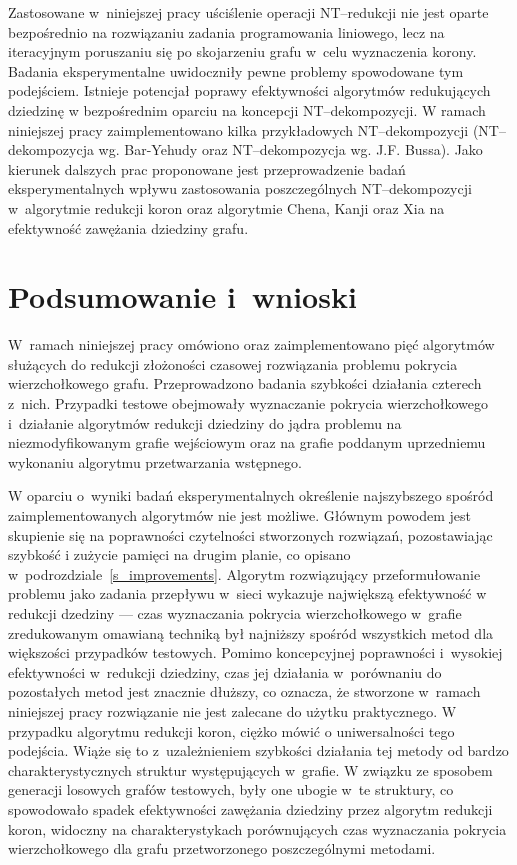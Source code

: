   Zastosowane w~niniejszej pracy uściślenie operacji NT--redukcji nie jest oparte bezpośrednio na rozwiązaniu zadania programowania liniowego, lecz na iteracyjnym poruszaniu się po skojarzeniu grafu w~celu wyznaczenia korony.
  Badania eksperymentalne uwidoczniły pewne problemy spowodowane tym podejściem.
  Istnieje potencjał poprawy efektywności algorytmów redukujących dziedzinę w bezpośrednim oparciu na koncepcji NT--dekompozycji.
  W ramach niniejszej pracy zaimplementowano kilka przykładowych NT--dekompozycji (NT--dekompozycja wg. Bar-Yehudy oraz NT--dekompozycja wg. J.F. Bussa).
  Jako kierunek dalszych prac proponowane jest przeprowadzenie badań eksperymentalnych wpływu zastosowania poszczególnych NT--dekompozycji w~algorytmie redukcji koron oraz algorytmie Chena, Kanji oraz Xia na efektywność zawężania dziedziny grafu.

\section*{Podsumowanie i~wnioski}
\addtocounter{section}{1}
  W~ramach niniejszej pracy omówiono oraz zaimplementowano pięć algorytmów służących do redukcji złożoności czasowej rozwiązania problemu pokrycia wierzchołkowego grafu. Przeprowadzono badania szybkości działania czterech z~nich.
  Przypadki testowe obejmowały wyznaczanie pokrycia wierzchołkowego i~działanie algorytmów redukcji dziedziny do jądra problemu na niezmodyfikowanym grafie wejściowym oraz na grafie poddanym uprzedniemu wykonaniu algorytmu przetwarzania wstępnego.

  W oparciu o~wyniki badań eksperymentalnych określenie najszybszego spośród zaimplementowanych algorytmów nie jest możliwe.
  Głównym powodem jest skupienie się na poprawności czytelności stworzonych rozwiązań, pozostawiając szybkość i zużycie pamięci na drugim planie, co opisano w~podrozdziale~\ref{s_improvements}.
  Algorytm rozwiązujący przeformułowanie problemu jako zadania przepływu w~sieci wykazuje największą efektywność w redukcji dzedziny --- czas wyznaczania pokrycia wierzchołkowego w~grafie zredukowanym omawianą techniką był najniższy spośród wszystkich metod dla większości przypadków testowych.
  Pomimo koncepcyjnej poprawności i~wysokiej efektywności w~redukcji dziedziny, czas jej działania w~porównaniu do pozostałych metod jest znacznie dłuższy, co oznacza, że stworzone w~ramach niniejszej pracy rozwiązanie nie jest zalecane do użytku praktycznego.
  W przypadku algorytmu redukcji koron, ciężko mówić o uniwersalności tego podejścia.
  Wiąże się to z~uzależnieniem szybkości działania tej metody od bardzo charakterystycznych struktur występujących w~grafie.
  W związku ze sposobem generacji losowych grafów testowych, były one ubogie w~te struktury, co spowodowało spadek efektywności zawężania dziedziny przez algorytm redukcji koron, widoczny na charakterystykach porównujących czas wyznaczania pokrycia wierzchołkowego dla grafu przetworzonego poszczególnymi metodami.


